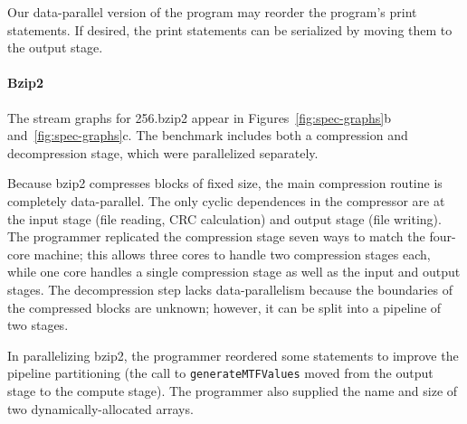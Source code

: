 Our data-parallel version of the program may reorder the program's
print statements.  If desired, the print statements can be serialized
by moving them to the output stage.


\paragraph*{Bzip2} The stream graphs for 256.bzip2 appear in
Figures~\ref{fig:spec-graphs}b and~\ref{fig:spec-graphs}c.  The
benchmark includes both a compression and decompression stage, which
were parallelized separately.

Because bzip2 compresses blocks of fixed size, the main compression
routine is completely data-parallel.  The only cyclic dependences in
the compressor are at the input stage (file reading, CRC calculation)
and output stage (file writing).  The programmer replicated the
compression stage seven ways to match the four-core machine; this
allows three cores to handle two compression stages each, while one
core handles a single compression stage as well as the input and
output stages.  The decompression step lacks data-parallelism because
the boundaries of the compressed blocks are unknown; however, it can
be split into a pipeline of two stages.

In parallelizing bzip2, the programmer reordered some statements to
improve the pipeline partitioning (the call to {\tt generateMTFValues}
moved from the output stage to the compute stage).  The programmer
also supplied the name and size of two dynamically-allocated arrays.

